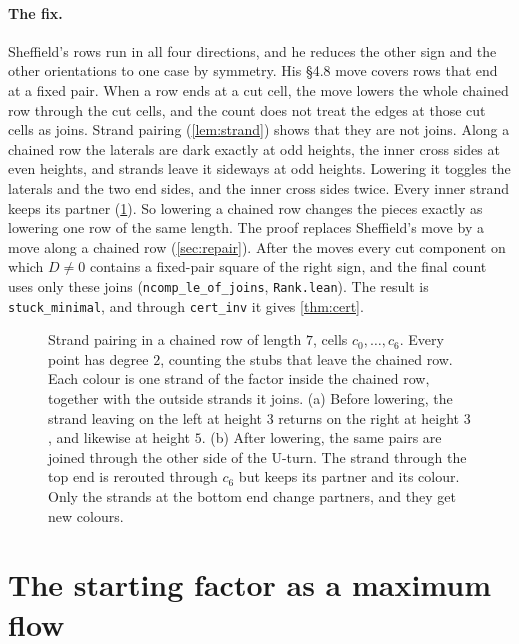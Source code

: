 \documentclass[11pt]{article}
\theoremstyle{plain}
\theoremstyle{definition}
\theoremstyle{remark}
\newcommand{\lean}[1]{\texttt{#1}}
\begin{document}
\paragraph{The fix.}
Sheffield's rows run in all four directions, and he reduces the other sign and the other
orientations to one case by symmetry.
His \S4.8 move covers rows that end at a fixed pair.
When a row ends at a cut cell, the move lowers the whole chained row through the cut cells, and the
count does not treat the edges at those cut cells as joins.
Strand pairing (\cref{lem:strand}) shows that they are not joins.
Along a chained row the laterals are dark exactly at odd heights, the inner cross sides at even
heights, and strands leave it sideways at odd heights.
Lowering it toggles the laterals and the two end sides, and the inner cross sides twice.
Every inner strand keeps its partner (\cref{fig:strand}).
So lowering a chained row changes the pieces exactly as lowering one row of the same length.
The proof replaces Sheffield's move by a move along a chained row (\cref{sec:repair}).
After the moves every cut component on which $D\ne0$ contains a fixed-pair square of the right sign,
and the final count uses only these joins (\lean{ncomp\_le\_of\_joins}, \lean{Rank.lean}).
The result is \lean{stuck\_minimal}, and through \lean{cert\_inv} it gives \cref{thm:cert}.

\begin{figure}[ht]
\centering

\caption{Strand pairing in a chained row of length $7$, cells $c_0,\dots,c_6$.
Every point has degree $2$, counting the stubs that leave the chained row.
Each colour is one strand of the factor inside the chained row, together with the outside strands
it joins.
(a) Before lowering, the strand leaving on the left at height $3$ returns on the right
at height $3$, and likewise at height $5$.
(b) After lowering, the same pairs are joined through the other side of the U-turn.
The strand through the top end is rerouted through $c_6$ but keeps its partner and its colour.
Only the strands at the bottom end change partners, and they get new colours.}
\label{fig:strand}
\end{figure}

\section{The starting factor as a maximum flow}
\label{app:flow}
\end{document}
